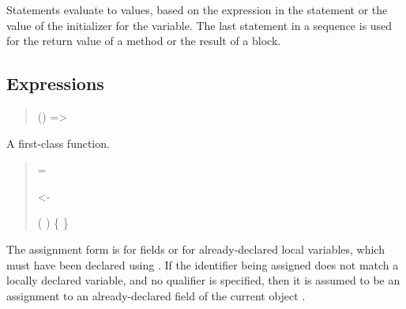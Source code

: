 Statements evaluate to values, based on the expression in the
statement or the value of the initializer for the variable.  The last
statement in a sequence is used for the return value of a method or
the result of a block.

\subsection{Expressions}

\begin{quote}








 {} ()
              => 

 {}

\end{quote}

A first-class function.  

\begin{quote}


 {}  = 

 {} <- 

 {} (  ) \{  \}

 {}

\end{quote}

The assignment form is for fields or for already-declared local
variables, which must have been declared using .  If the
identifier being assigned does not match a locally declared variable,
and no qualifier is specified, then it is assumed to be an assignment
to an already-declared field of the current object .


